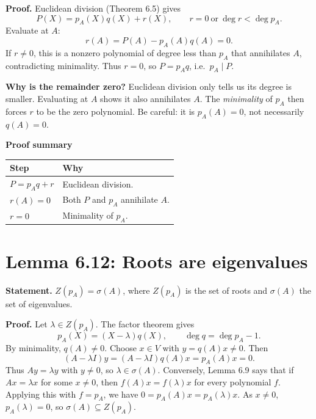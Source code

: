 \documentclass[11pt,a4paper]{article}
\newcommand{\prooftable}[1]{\medskip\textbf{Proof summary}\par\smallskip #1\medskip}
\begin{document}
\textbf{Proof.} Euclidean division (Theorem 6.5) gives
\[
P(X)=p_A(X)q(X)+r(X),\qquad r=0\ \text{or}\ \deg r<\deg p_A.
\]
Evaluate at \(A\):
\[
r(A)=P(A)-p_A(A)q(A)=0.
\]
If \(r\neq0\), this is a nonzero polynomial of degree less than \(p_A\)
that annihilates \(A\), contradicting minimality. Thus \(r=0\), so
\(P=p_Aq\), i.e.\ \(p_A\mid P\).

\begin{personalnote}
\textbf{Why is the remainder zero?} Euclidean division only tells us
its degree is smaller. Evaluating at \(A\) shows it also annihilates \(A\).
The \emph{minimality} of \(p_A\) then forces \(r\) to be the zero polynomial.
Be careful: it is \(p_A(A)=0\), not necessarily \(q(A)=0\).
\end{personalnote}
\prooftable{\begin{tabularx}{\linewidth}{@{}p{.28\linewidth}X@{}}\hline
Step & Why\\\hline
\(P=p_Aq+r\) & Euclidean division.\\
\(r(A)=0\) & Both \(P\) and \(p_A\) annihilate \(A\).\\
\(r=0\) & Minimality of \(p_A\).\\\hline
\end{tabularx}}

\section*{Lemma 6.12: Roots are eigenvalues}
\textbf{Statement.} \(Z(p_A)=\sigma(A)\), where \(Z(p_A)\) is the set of roots
and \(\sigma(A)\) the set of eigenvalues.

\textbf{Proof.} Let \(\lambda\in Z(p_A)\). The factor theorem gives
\[
p_A(X)=(X-\lambda)q(X),\qquad \deg q=\deg p_A-1.
\]
By minimality, \(q(A)\neq0\). Choose \(x\in V\) with
\(y=q(A)x\neq0\). Then
\[
(A-\lambda I)y=(A-\lambda I)q(A)x=p_A(A)x=0.
\]
Thus \(Ay=\lambda y\) with \(y\neq0\), so \(\lambda\in\sigma(A)\).
Conversely, Lemma 6.9 says that if \(Ax=\lambda x\) for some \(x\neq0\), then \(f(A)x=f(\lambda)x\) for every polynomial \(f\). Applying this with \(f=p_A\), we have \(0=p_A(A)x=p_A(\lambda)x\). As \(x\neq0\), \(p_A(\lambda)=0\), so \(\sigma(A)\subseteq Z(p_A)\).
\end{document}
